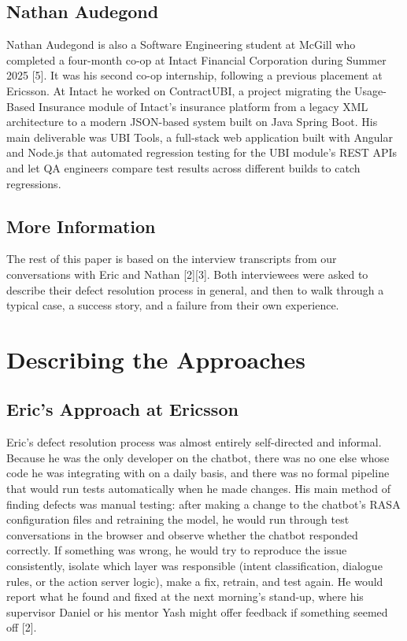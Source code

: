 \documentclass[sigconf]{acmart}
\begin{document}
\subsection{Nathan Audegond}

Nathan Audegond is also a Software Engineering student at McGill who completed a four-month co-op at Intact Financial Corporation during Summer 2025 [5]. It was his second co-op internship, following a previous placement at Ericsson. At Intact he worked on ContractUBI, a project migrating the Usage-Based Insurance module of Intact's insurance platform from a legacy XML architecture to a modern JSON-based system built on Java Spring Boot. His main deliverable was UBI Tools, a full-stack web application built with Angular and Node.js that automated regression testing for the UBI module's REST APIs and let QA engineers compare test results across different builds to catch regressions.

\subsection{More Information}

The rest of this paper is based on the interview transcripts from our conversations with Eric and Nathan [2][3]. Both interviewees were asked to describe their defect resolution process in general, and then to walk through a typical case, a success story, and a failure from their own experience.

\section{Describing the Approaches}

\subsection{Eric's Approach at Ericsson}

Eric's defect resolution process was almost entirely self-directed and informal. Because he was the only developer on the chatbot, there was no one else whose code he was integrating with on a daily basis, and there was no formal pipeline that would run tests automatically when he made changes. His main method of finding defects was manual testing: after making a change to the chatbot's RASA configuration files and retraining the model, he would run through test conversations in the browser and observe whether the chatbot responded correctly. If something was wrong, he would try to reproduce the issue consistently, isolate which layer was responsible (intent classification, dialogue rules, or the action server logic), make a fix, retrain, and test again. He would report what he found and fixed at the next morning's stand-up, where his supervisor Daniel or his mentor Yash might offer feedback if something seemed off [2].
\end{document}
